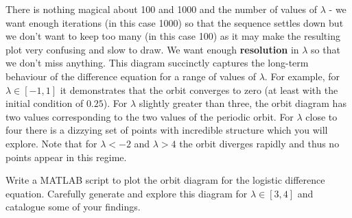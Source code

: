 There is nothing magical about 100 and 1000 and the number of values of $\lambda$ - we want enough iterations (in this case 1000) so that the sequence settles down but we don't want to keep too many (in this case 100) as it may make the resulting plot very confusing and slow to draw. We want enough {\bf resolution} in $\lambda$ so that we don't miss anything. This diagram succinctly captures the long-term behaviour of the difference equation for a range of values of $\lambda$. For example, for $\lambda \in [-1,1]$ it demonstrates that the orbit converges to zero (at least with the initial condition of $0.25$). For $\lambda$ slightly greater than three, the orbit diagram has two values corresponding to the two values of the periodic orbit. For $\lambda$ close to four there is a dizzying set of points with incredible structure which you will explore. Note that for $\lambda < -2$ and $\lambda > 4$ the orbit diverges rapidly and thus no points appear in this regime.

\begin{del}
Write a MATLAB script to plot the orbit diagram for the logistic difference equation. Carefully generate and explore this diagram for $\lambda \in [3,4]$ and catalogue some of your findings. 
\end{del}

